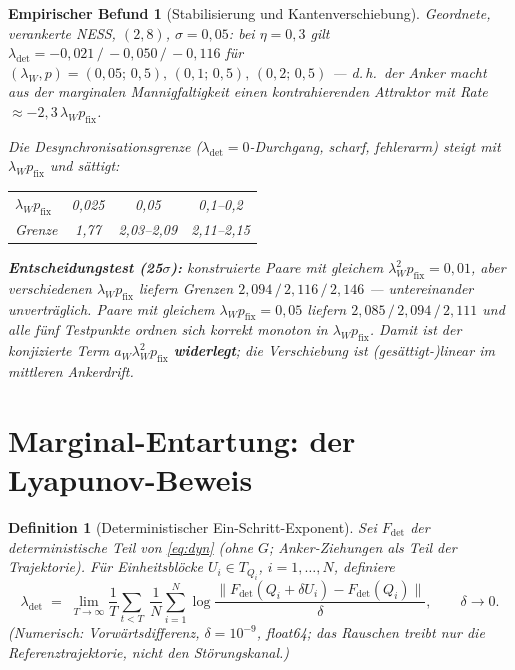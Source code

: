 \documentclass[11pt,a4paper]{article}
\newtheorem{definition}[satz]{Definition}
\newtheorem{befund}{Empirischer Befund}
\theoremstyle{remark}
\begin{document}
\begin{befund}[Stabilisierung und Kantenverschiebung]\label{bef:anker}
Geordnete, verankerte NESS, $(2,8)$, $\sigma=0{,}05$: bei $\eta=0{,}3$
gilt $\lambda_{\mathrm{det}}=-0{,}021\,/\,-0{,}050\,/\,-0{,}116$ für
$(\lambda_W,p)=(0{,}05;\,0{,}5),\,(0{,}1;\,0{,}5),\,(0{,}2;\,0{,}5)$ ---
d.\,h.\ der Anker macht aus der marginalen Mannigfaltigkeit einen
kontrahierenden Attraktor mit Rate $\approx-2{,}3\,\lambda_W p_{\mathrm{fix}}$.

Die Desynchronisationsgrenze ($\lambda_{\mathrm{det}}=0$-Durchgang, scharf,
fehlerarm) steigt mit $\lambda_W p_{\mathrm{fix}}$ und sättigt:
\begin{center}
\begin{tabular}{lccc}
\toprule
$\lambda_W p_{\mathrm{fix}}$ & 0{,}025 & 0{,}05 & 0{,}1--0{,}2\\
Grenze & 1{,}77 & 2{,}03--2{,}09 & 2{,}11--2{,}15\\
\bottomrule
\end{tabular}
\end{center}
\textbf{Entscheidungstest (25$\sigma$):} konstruierte Paare mit
\emph{gleichem} $\lambda_W^2p_{\mathrm{fix}}=0{,}01$, aber verschiedenen
$\lambda_W p_{\mathrm{fix}}$ liefern Grenzen $2{,}094\,/\,2{,}116\,/\,2{,}146$ ---
untereinander unverträglich. Paare mit gleichem
$\lambda_W p_{\mathrm{fix}}=0{,}05$ liefern $2{,}085\,/\,2{,}094\,/\,2{,}111$
und alle fünf Testpunkte ordnen sich korrekt monoton in
$\lambda_W p_{\mathrm{fix}}$. Damit ist der konjizierte Term
$a_W\lambda_W^2p_{\mathrm{fix}}$ \textbf{widerlegt}; die Verschiebung ist
(gesättigt-)linear im mittleren Ankerdrift.
\end{befund}

\section{Marginal-Entartung: der Lyapunov-Beweis}

\begin{definition}[Deterministischer Ein-Schritt-Exponent]\label{def:ladet}
Sei $F_{\mathrm{det}}$ der deterministische Teil von \eqref{eq:dyn}
(ohne $G$; Anker-Ziehungen als Teil der Trajektorie). Für Einheitsblöcke
$U_i\in T_{Q_i}$, $i=1,\dots,N$, definiere
\[
\lambda_{\mathrm{det}}
\;=\;\lim_{T\to\infty}\frac1T\sum_{t<T}\;\frac1N\sum_{i=1}^N
\log\frac{\big\|F_{\mathrm{det}}(Q_i+\delta U_i)-F_{\mathrm{det}}(Q_i)\big\|}{\delta},
\qquad \delta\to0 .
\]
(Numerisch: Vorwärtsdifferenz, $\delta=10^{-9}$, float64; das Rauschen
treibt nur die Referenztrajektorie, nicht den Störungskanal.)
\end{definition}
\end{document}
